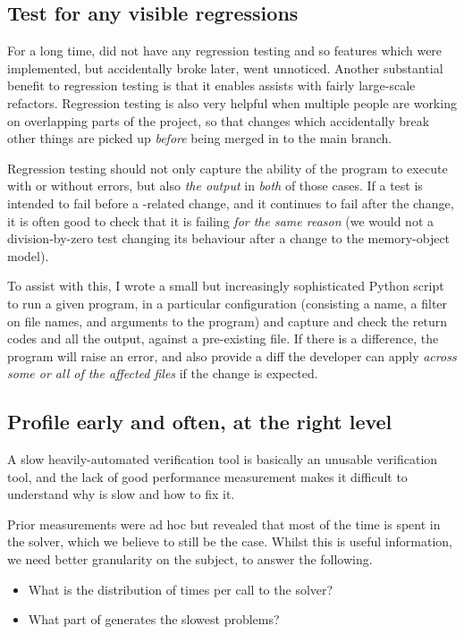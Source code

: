 \subsection{Test for any visible regressions}

For a long time,  did not have any regression testing and so features
which were implemented, but accidentally broke later, went unnoticed.
Another substantial benefit to regression testing is that it enables assists
with fairly large-scale refactors. Regression testing is also very helpful when
multiple people are working on overlapping parts of the project, so that
changes which accidentally break other things are picked up \emph{before} being
merged in to the main branch.

Regression testing should not only capture the ability of the program to
execute with or without errors, but also \emph{the output} in \emph{both} of
those cases. If a test is intended to fail before a -related change,
and it continues to fail after the change, it is often good to check that it is
failing \emph{for the same reason} (we would not a division-by-zero test
changing its behaviour after a change to the memory-object model).

To assist with this, I wrote a small but increasingly sophisticated Python
script
to run a given program, in a particular configuration (consisting a name, a
filter on file names, and arguments to the program) and capture and check the
return codes and all the output, against a pre-existing file. If there is a
difference, the program will raise an error, and also provide a diff the
developer can apply \emph{across some or all of the affected files} if the
change is expected.

\subsection{Profile early and often, at the right level}\label{subsec:profile}

A slow heavily-automated verification tool is basically an unusable
verification tool, and the lack of good performance measurement makes it
difficult to understand why  is slow and how to fix it.

Prior measurements were ad hoc but revealed that most of the time is spent in
the solver, which we believe to still be the case. Whilst this is useful
information, we need better granularity on the subject, to answer the following.
\begin{itemize}
    \item What is the distribution of times per call to the solver?
    \item What part of  generates the slowest problems?
\end{itemize}


